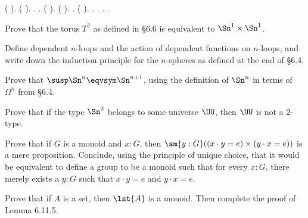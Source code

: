 \begin{coqdoccode}
 (\coqdocvar{\_}  \coqdocnotation{(} \coqdocvar{\_} \coqdocvar{\_} \coqdocvar{\_}\coqdocnotation{)}).\coqdoceol
\coqdocindent{1.00em}
 (\coqdocnotation{(} \coqdocvar{\_} \coqdocvar{\_} \coqdocvar{\_}\coqdocnotation{)}  \coqdocvar{\_}).\coqdoceol
\coqdocindent{1.00em}
.  .\coqdoceol
\coqdocindent{1.00em}
 (\coqdocvar{\_}  \coqdocnotation{(} \coqdocvar{\_} \coqdocvar{\_}\coqdocnotation{)\^{}}).  (\coqdocnotation{(} \coqdocvar{\_} \coqdocvar{\_} \coqdocvar{\_}\coqdocnotation{)}  \coqdocvar{\_}).  .\coqdoceol
\coqdocindent{1.00em}
 (\coqdocvar{\_}  \coqdocnotation{(} \coqdocvar{\_} \coqdocvar{\_}\coqdocnotation{)\^{}}). .  .\coqdoceol
\coqdocindent{1.00em}
 .\coqdoceol
\coqdocnoindent
{}.\coqdoceol
\coqdocemptyline
\end{coqdoccode}
Prove that the torus $T^{2}$ as defined in \S6.6 
is equivalent to $\Sn^{1} \times \Sn^{1}$.


Define dependent $n$-loops and the action of dependent functions on $n$-loops,
and write down the induction principle for the $n$-spheres as defined at the
end of \S6.4.


Prove that $\susp\Sn^{n} \eqvsym \Sn^{n+1}$, using the definition of $\Sn^{n}$
in terms of $\Omega^{n}$ from \S6.4.


Prove that if the type $\Sn^{2}$ belongs to some universe $\UU$, then $\UU$ is
not a 2-type.


Prove that if $G$ is a monoid and $x : G$, then $\sm{y:G}((x \cdot y = e)
\times (y \cdot x = e))$ is a mere proposition.  Conclude, using the principle
of unique choice, that it would be equivalent to define a group to be a monoid
such that for every $x : G$, there merely exists a $y : G$ such that $x \cdot y
= e$ and $y \cdot x = e$.


Prove that if $A$ is a set, then $\lst{A}$ is a monoid.  Then complete the
proof of Lemma 6.11.5.


